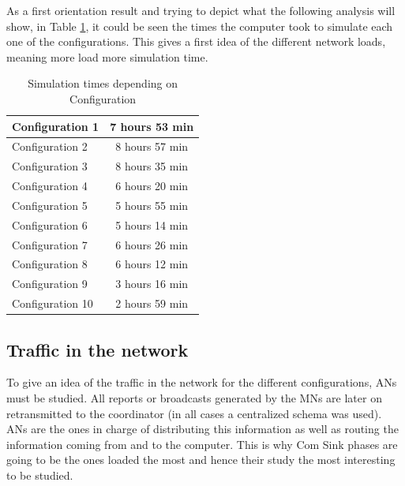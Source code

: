 As a first orientation result and trying to depict what the following analysis will show, in Table \ref{tab:simulationtimes}, it could be seen the times 
the computer took to simulate each one of the configurations. This gives a first idea of the different network loads, meaning more load more simulation
time.

\begin{table}
 \begin{center}
  \begin{tabular}{|l|c|}
   \hline
   Configuration 1 & 7 hours 53 min \\
   \hline
   Configuration 2 & 8 hours 57 min \\
   \hline
   Configuration 3 & 8 hours 35 min \\
   \hline
   Configuration 4 & 6 hours 20 min \\
   \hline
   Configuration 5 & 5 hours 55 min \\
   \hline
   Configuration 6 & 5 hours 14 min \\
   \hline
   Configuration 7 & 6 hours 26 min \\
   \hline
   Configuration 8 & 6 hours 12 min \\
   \hline
   Configuration 9 & 3 hours 16 min \\
   \hline
   Configuration 10 & 2 hours 59 min \\
   \hline
  \end{tabular}
  \caption{Simulation times depending on Configuration}
  \label{tab:simulationtimes}
 \end{center}
\end{table}

\subsection{Traffic in the network}

To give an idea of the traffic in the network for the different configurations, \acp{AN} must be studied. All reports or broadcasts generated by the
\acp{MN} are later on retransmitted to the coordinator (in all cases a centralized schema was used). \acp{AN} are the ones in charge of distributing this
information as well as routing the information coming from and to the computer. This is why Com Sink phases are going to be the ones loaded
the most and hence their study the most interesting to be studied.

